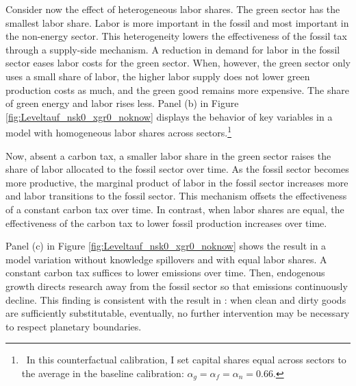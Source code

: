 Consider now the effect of heterogeneous labor shares. The green sector has the smallest labor share. Labor is more important in the fossil and most important in the non-energy sector. This heterogeneity lowers the effectiveness of the fossil tax through a supply-side mechanism. 
 A reduction in demand for labor in the fossil sector eases labor costs for the green sector. When, however, the green sector only uses a small share of labor, the higher labor supply does not lower green production costs as much, and the green good remains more expensive. The share of green energy and labor rises less. Panel (b) in Figure \ref{fig:Leveltauf_nsk0_xgr0_noknow} displays the behavior of key variables in a model with homogeneous labor shares across sectors.\footnote{\ In this counterfactual calibration, I set capital shares equal across sectors to the average in the baseline calibration: $\alpha_g=\alpha_f=\alpha_n=0.66$. }


Now, absent a carbon tax, a smaller labor share in the green sector raises the share of labor allocated to the fossil sector over time. As the fossil sector becomes more productive, the marginal product of labor in the fossil sector increases more and labor transitions to the fossil sector. This mechanism offsets the effectiveness of a constant carbon tax over time. In contrast, when labor shares are equal, the effectiveness of the carbon tax to lower fossil production increases over time. 




Panel (c) in Figure \ref{fig:Leveltauf_nsk0_xgr0_noknow} shows the result in a model variation without knowledge spillovers and with equal labor shares. A constant carbon tax suffices to lower emissions over time. Then, endogenous growth directs research away from the fossil sector so that emissions continuously decline.  This finding is consistent with the result in \cite{Acemoglu2012TheChange}:  when clean and dirty goods are sufficiently substitutable, eventually, no further intervention may be necessary to respect planetary boundaries.


